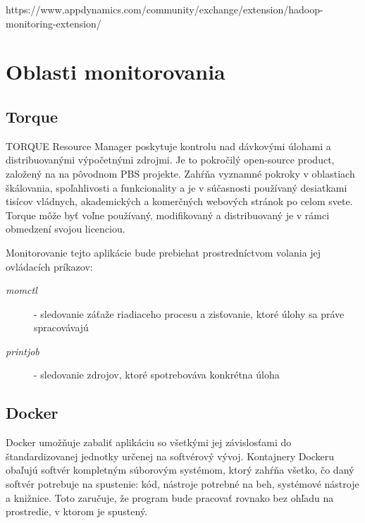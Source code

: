 \documentclass[11pt,final,oneside]{fithesis}
\begin{document}
https://www.appdynamics.com/community/exchange/extension/hadoop-monitoring-extension/

\chapter{Oblasti monitorovania}
\section{Torque}
TORQUE Resource Manager poskytuje kontrolu nad dávkovými úlohami a distribuovanými výpočetnými zdrojmi. Je to pokročilý open-source product, založený na na pôvodnom PBS projekte. 
Zahŕňa vyznamné pokroky v oblastiach škálovania, spoľahlivosti a funkcionality a je v súčasnosti používaný desiatkami tisícov vládnych, akademických a komerčných webových stránok po celom svete. Torque môže byť voľne používaný, modifikovaný a distribuovaný je v rámci obmedzení svojou licenciou.\cite{torque}

Monitorovanie tejto aplikácie bude prebiehat prostredníctvom volania jej ovládacích príkazov:
\begin{description}
\item[\emph{momctl}] - sledovanie záťaže riadiaceho procesu a zisťovanie, ktoré úlohy sa práve spracovávajú
\item[\emph{printjob}] - sledovanie zdrojov, ktoré spotrebováva konkrétna úloha 
\end{description}



\section{Docker}
Docker umožňuje zabaliť aplikáciu so všetkými jej závislosťami do štandardizovanej jednotky určenej na softvérový vývoj. Kontajnery Dockeru obaľujú softvér kompletným súborovým systémom, ktorý
zahŕňa všetko, čo daný softvér potrebuje na spustenie: kód, nástroje potrebné na beh, systémové nástroje a knižnice. Toto zaručuje, že program bude pracovať rovnako bez ohľadu na prostredie, v ktorom
je spustený.\cite{docker}
\end{document}
